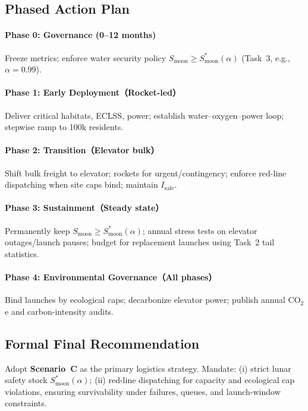 ﻿\documentclass{mcmthesis}
\begin{document}
\subsection{Phased Action Plan}
\label{subsec:phased_plan}
\paragraph{Phase 0: Governance (0--12 months)} Freeze metrics; enforce water security policy
$S_{\text{moon}}\ge S_{\text{moon}}^{*}(\alpha)$ (Task~3, e.g., $\alpha=0.99$).

\paragraph{Phase 1: Early Deployment（Rocket-led）} Deliver critical habitats, ECLSS, power; establish water--oxygen--power loop; stepwise ramp to 100k residents.

\paragraph{Phase 2: Transition（Elevator bulk）} Shift bulk freight to elevator; rockets for urgent/contingency; enforce red-line dispatching when site caps bind; maintain $I_{\text{safe}}$.

\paragraph{Phase 3: Sustainment（Steady state）} Permanently keep $S_{\text{moon}}\ge S_{\text{moon}}^{*}(\alpha)$; annual stress tests on elevator outages/launch pauses; budget for replacement launches using Task~2 tail statistics.

\paragraph{Phase 4: Environmental Governance（All phases）} Bind launches by ecological caps; decarbonize elevator power; publish annual CO$_2$e and carbon-intensity audits.

\subsection{Formal Final Recommendation}
\label{subsec:formal_recommendation}
Adopt \textbf{Scenario~C} as the primary logistics strategy. Mandate: (i) strict lunar safety stock $S_{\text{moon}}^{*}(\alpha)$; (ii) red-line dispatching for capacity and ecological cap violations, ensuring survivability under failures, queues, and launch-window constraints.
\end{document}
